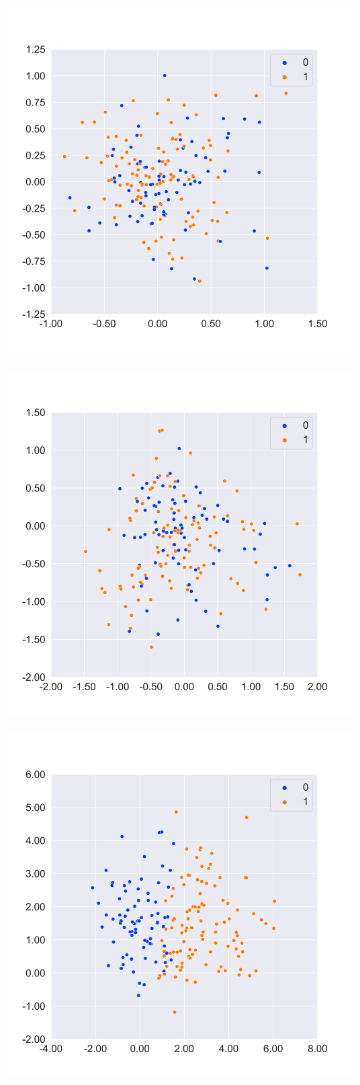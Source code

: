 \begin{figure}[htbp]
    \centering
    \begin{subfigure}
        \centering
        \includegraphics[width=0.45\linewidth]{../images/sst2_feature_map1_pca.png}
    \end{subfigure}
    \begin{subfigure}
        \centering
        \includegraphics[width=0.45\linewidth]{../images/sst2_feature_map2_pca.png}
    \end{subfigure}
    \begin{subfigure}
        \centering
        \includegraphics[width=0.45\linewidth]{../images/sst2_feature_map3_pca.png}

\end{subfigure}
\end{figure}
